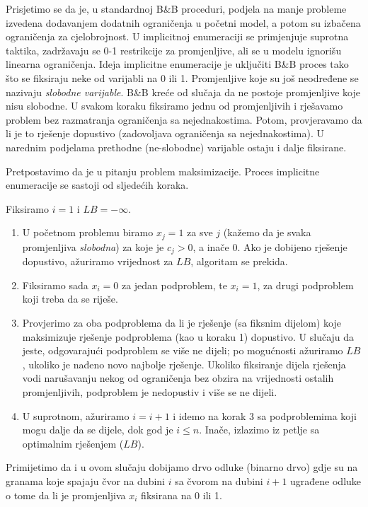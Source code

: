 \documentclass[a4paper, utf8, 11pt, colorlinks]{book}
\theoremstyle{definition}
\begin{document}
Prisjetimo se da je, u standardnoj B\&B proceduri, podjela na manje probleme izvedena dodavanjem dodatnih ograničenja u početni model, a potom su izbačena ograničenja za cjelobrojnost. 
U implicitnoj enumeraciji se primjenjuje suprotna taktika, zadržavaju se 0-1 restrikcije za promjenljive, ali se  u modelu ignorišu linearna ograničenja. 
Ideja implicitne enumeracije je uključiti B\&B proces tako što se fiksiraju neke od varijabli na 0 ili 1. Promjenljive koje su još neodređene se nazivaju \emph{slobodne varijable}.  B\&B kreće od slučaja da ne postoje promjenljive koje nisu slobodne. U svakom koraku fiksiramo jednu od promjenljivih i rješavamo problem bez razmatranja ograničenja sa nejednakostima. Potom, provjeravamo da li je to rješenje dopustivo (zadovoljava ograničenja sa nejednakostima). U narednim podjelama  prethodne (ne-slobodne) varijable ostaju i dalje fiksirane. 


Pretpostavimo da je u pitanju problem maksimizacije. Proces implicitne enumeracije se sastoji od sljedećih koraka. 

Fiksiramo $i=1$ i $LB=-\infty$. 

\begin{enumerate}
    \item U početnom problemu  biramo $x_j=1$ za sve $j$ (kažemo da je svaka promjenljiva \emph{slobodna}) za koje je $c_j > 0$, a inače 0. Ako je dobijeno rješenje dopustivo, ažuriramo vrijednost za $LB$, algoritam se prekida.
    \item Fiksiramo sada $x_i=0$ za jedan podproblem, te $x_i=1$, za drugi podproblem koji treba da se riješe.
    
    \item  Provjerimo za oba podproblema da li je rješenje (sa fiksnim dijelom) koje maksimizuje rješenje podproblema (kao u koraku 1) dopustivo. U slučaju da jeste,   odgovarajući podproblem se više ne dijeli; po mogućnosti ažuriramo $LB$, ukoliko je nađeno novo najbolje rješenje.  Ukoliko fiksiranje dijela rješenja vodi narušavanju nekog od ograničenja bez obzira na vrijednosti ostalih promjenljivih, podproblem je nedopustiv i više se ne dijeli. 
    
    
    \item U suprotnom, ažuriramo $i = i+1$ i idemo na korak 3 sa podproblemima koji mogu dalje da se dijele, dok god je $i \leq n$. Inače, izlazimo iz petlje sa optimalnim rješenjem ($LB$). 
\end{enumerate}
 Primijetimo da i u ovom slučaju dobijamo drvo odluke (binarno drvo) gdje su na granama koje spajaju čvor na dubini $i$ sa čvorom na dubini $i+1$  ugrađene odluke o tome da li je promjenljiva $x_i$ fiksirana na 0 ili 1.
\end{document}
